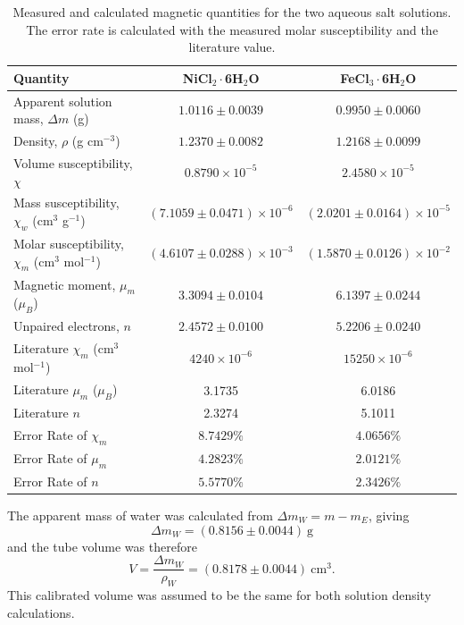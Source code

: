 \documentclass[12pt]{article}
\begin{document}
\begin{table}[htbp]
    \centering
    \caption{Measured and calculated magnetic quantities for the two aqueous salt solutions. The error rate is calculated with the measured molar susceptibility and the literature value. \cite{miller1985litmag,masson1957litmag}}
    \label{tab:results}
    \begin{tabular}{p{2.35in}cc}
        \toprule
        Quantity & NiCl$_2\cdot$6H$_2$O & FeCl$_3\cdot$6H$_2$O \\
        \midrule
        Apparent solution mass, $\Delta m$ (g) & $1.0116 \pm 0.0039$ & $0.9950 \pm 0.0060$ \\
        Density, $\rho$ (g cm$^{-3}$) & $1.2370 \pm 0.0082$ & $1.2168 \pm 0.0099$ \\
        Volume susceptibility, $\chi$ & $0.8790\times10^{-5}$ & $2.4580\times10^{-5}$ \\
        Mass susceptibility, $\chi_w$ (cm$^3$ g$^{-1}$) & $(7.1059 \pm 0.0471)\times10^{-6}$ & $(2.0201 \pm 0.0164)\times10^{-5}$ \\
        Molar susceptibility, $\chi_m$ (cm$^3$ mol$^{-1}$) & $(4.6107 \pm 0.0288)\times10^{-3}$ & $(1.5870 \pm 0.0126)\times10^{-2}$ \\
        Magnetic moment, $\mu_m$ ($\mu_B$) & $3.3094 \pm 0.0104$ & $6.1397 \pm 0.0244$ \\
        Unpaired electrons, $n$ & $2.4572 \pm 0.0100$ & $5.2206 \pm 0.0240$ \\
        Literature $\chi_m$ \cite{miller1985litmag,masson1957litmag} (cm$^3$ mol$^{-1}$) & $4240\times10^{-6}$ & $15250\times10^{-6}$ \\
        Literature $\mu_m$ \cite{miller1985litmag,masson1957litmag} ($\mu_B$) & 3.1735 & 6.0186 \\
        Literature $n$ \cite{miller1985litmag,masson1957litmag}  & 2.3274 & 5.1011 \\
        Error Rate of $\chi_m$& $8.7429\%$ & $4.0656\%$ \\
        Error Rate of $\mu_m$& $4.2823\%$ & $2.0121\%$ \\
        Error Rate of $n$& $5.5770\%$ & $2.3426\%$ \\
        \bottomrule
    \end{tabular}
\end{table}

The apparent mass of water was calculated from $\Delta m_W = m-m_E$, giving
\begin{equation}
\Delta m_W=(0.8156\pm0.0044)\ \mathrm{g}
\end{equation}
and the tube volume was therefore
\begin{equation}
V=\frac{\Delta m_W}{\rho_W}=(0.8178\pm0.0044)\ \mathrm{cm^3}.
\end{equation}
This calibrated volume was assumed to be the same for both solution density calculations.
\end{document}
